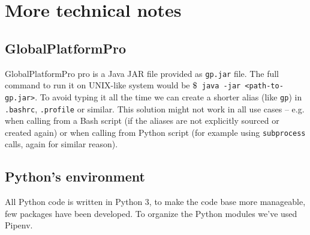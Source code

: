 \documentclass[a4paper]{scrartcl}
\newcommand{\dollar}{\mbox{\textdollar}}
\begin{document}
\section*{More technical notes}

\subsection{GlobalPlatformPro}

GlobalPlatformPro pro is a Java JAR file provided as \texttt{gp.jar} file. The full command to run it on UNIX-like system would be \texttt{$\dollar$ java -jar <path-to-gp.jar>}. To avoid typing it all the time we can create a shorter alias (like \texttt{gp}) in \texttt{.bashrc}, \texttt{.profile} or similar. This solution might not work in all use cases -- e.g. when calling from a Bash script (if the aliases are not explicitly sourced or created again) or when calling from Python script (for example using \texttt{subprocess} calls, again for similar reason).

\subsection{Python's environment}

All Python code is written in Python 3, to make the code base more manageable, few packages have been developed. To organize the Python modules we've used Pipenv.
\end{document}
